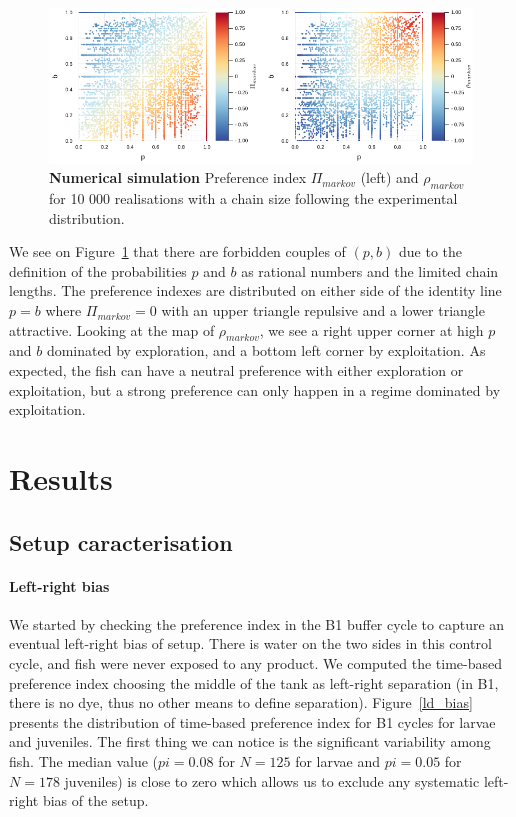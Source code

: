   \begin{figure}[h]
    \centering
    \includegraphics[width=1\textwidth]{part_2/assets/pi_pb.png}
    \caption{\textbf{Numerical simulation} Preference index $\Pi_{markov}$ (left) and $\rho_{markov}$ for 10 000 realisations with a chain size following the experimental distribution.}
    \label{markov_simu}
  \end{figure}

  We see on Figure~\ref{markov_simu} that there are forbidden couples of $(p,b)$ due to the definition of the probabilities $p$ and $b$ as rational numbers and the limited chain lengths. The preference indexes are distributed on either side of the identity line $p=b$ where $\Pi_{markov} = 0$ with an upper triangle repulsive and a lower triangle attractive. Looking at the map of $\rho_{markov}$, we see a right upper corner at high $p$ and $b$ dominated by exploration, and a bottom left corner by exploitation. As expected, the fish can have a neutral preference with either exploration or exploitation, but a strong preference can only happen in a regime dominated by exploitation.

  \section{Results}
  \subsection{Setup caracterisation}
  \paragraph{Left-right bias} We started by checking the preference index in the B1 buffer cycle to capture an eventual left-right bias of setup. There is water on the two sides in this control cycle, and fish were never exposed to any product. We computed the time-based preference index choosing the middle of the tank as left-right separation (in B1, there is no dye, thus no other means to define separation). Figure~\ref{ld_bias} presents the distribution of time-based preference index for B1 cycles for larvae and juveniles. The first thing we can notice is the significant variability among fish. The median value ($pi = 0.08$ for $N=125$ for larvae and $pi = 0.05$ for $N = 178$ juveniles) is close to zero which allows us to exclude any systematic left-right bias of the setup.

